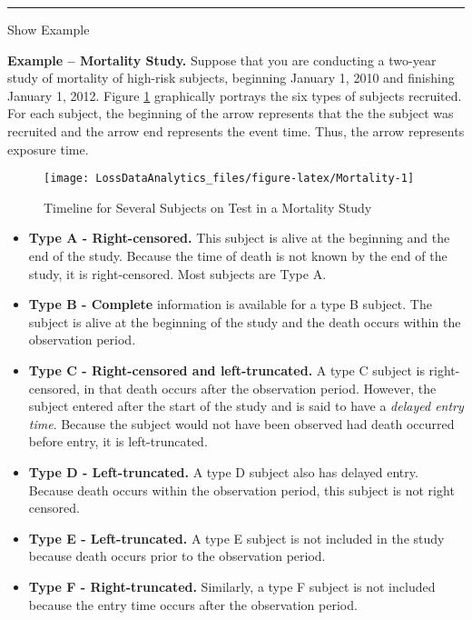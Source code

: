 \documentclass[]{book}
\providecommand{\tightlist}{%
  \setlength{\itemsep}{0pt}\setlength{\parskip}{0pt}}
\theoremstyle{definition}
\theoremstyle{definition}
\theoremstyle{definition}
\theoremstyle{remark}
\begin{document}
\begin{center}\rule{0.5\linewidth}{\linethickness}\end{center}

Show Example

\hypertarget{toggleExampleMort}{}
\textbf{Example -- Mortality Study.} Suppose that you are conducting a
two-year study of mortality of high-risk subjects, beginning January 1,
2010 and finishing January 1, 2012. Figure \ref{fig:Mortality}
graphically portrays the six types of subjects recruited. For each
subject, the beginning of the arrow represents that the the subject was
recruited and the arrow end represents the event time. Thus, the arrow
represents exposure time.

\begin{figure}

{\centering \texttt{[image: LossDataAnalytics\_files/figure-latex/Mortality-1]} 

}

\caption{Timeline for Several Subjects on Test in a Mortality Study}\label{fig:Mortality}
\end{figure}

\begin{itemize}
\tightlist
\item
  \textbf{Type A - Right-censored.} This subject is alive at the
  beginning and the end of the study. Because the time of death is not
  known by the end of the study, it is right-censored. Most subjects are
  Type A.
\item
  \textbf{Type B - Complete} information is available for a type B
  subject. The subject is alive at the beginning of the study and the
  death occurs within the observation period.
\item
  \textbf{Type C - Right-censored and left-truncated.} A type C subject
  is right-censored, in that death occurs after the observation period.
  However, the subject entered after the start of the study and is said
  to have a \emph{delayed entry time}. Because the subject would not
  have been observed had death occurred before entry, it is
  left-truncated.
\item
  \textbf{Type D - Left-truncated.} A type D subject also has delayed
  entry. Because death occurs within the observation period, this
  subject is not right censored.
\item
  \textbf{Type E - Left-truncated.} A type E subject is not included in
  the study because death occurs prior to the observation period.
\item
  \textbf{Type F - Right-truncated.} Similarly, a type F subject is not
  included because the entry time occurs after the observation period.
\end{itemize}
\end{document}

